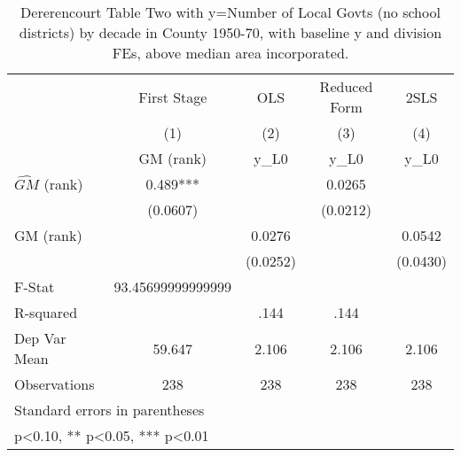 \begin{table}[htbp]\centering
\def\sym#1{\ifmmode^{#1}\else\(^{#1}\)\fi}
\caption{Dererencourt Table Two with y=Number of Local Govts (no school districts) by decade in County 1950-70, with baseline y and division FEs, above median area incorporated.}
\begin{tabular}{l*{4}{c}}
\toprule
                    & First Stage   &         OLS   &Reduced Form   &        2SLS   \\
                    &\multicolumn{1}{c}{(1)}&\multicolumn{1}{c}{(2)}&\multicolumn{1}{c}{(3)}&\multicolumn{1}{c}{(4)}\\
                    &\multicolumn{1}{c}{GM  (rank)}&\multicolumn{1}{c}{y\_L0}&\multicolumn{1}{c}{y\_L0}&\multicolumn{1}{c}{y\_L0}\\
\midrule
$\hat{GM}$ (rank)   &       0.489***&               &      0.0265   &               \\
                    &    (0.0607)   &               &    (0.0212)   &               \\
\addlinespace
GM  (rank)          &               &      0.0276   &               &      0.0542   \\
                    &               &    (0.0252)   &               &    (0.0430)   \\
\midrule
F-Stat              &93.45699999999999   &               &               &               \\
R-squared           &               &        .144   &        .144   &               \\
Dep Var Mean        &      59.647   &       2.106   &       2.106   &       2.106   \\
Observations        &         238   &         238   &         238   &         238   \\
\bottomrule
\multicolumn{5}{l}{\footnotesize Standard errors in parentheses}\\
\multicolumn{5}{l}{\footnotesize * p<0.10, ** p<0.05, *** p<0.01}\\
\end{tabular}
\end{table}
